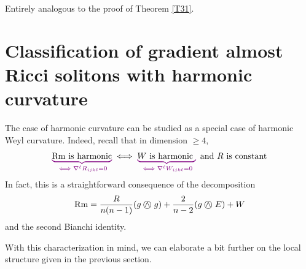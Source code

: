 \begin{demm}
	Entirely analogous to the proof of Theorem \cref{T31}.
\end{demm}


\section{Classification of gradient almost Ricci solitons with harmonic curvature}
The case of harmonic curvature can be studied as a special case of harmonic Weyl curvature. Indeed, recall that in dimension $\geq 4$,
\[
\Munderbrace{\Rm \text{ is harmonic}}{\iff \nabla^{\ell} R_{ijk\ell} = 0} \iff \Munderbrace{W \text{ is harmonic }}{\iff \nabla^{\ell} W_{ijk \ell} = 0} \text{ and } R \text{ is constant} 
\]
In fact, this is a straightforward consequence of the decomposition
\[
\mathrm{Rm} = \frac{R}{n(n-1)} (g \mathbin{\bigcirc\mspace{-15mu}\wedge\mspace{4mu}} g) + \frac{2}{n-2} (g \mathbin{\bigcirc\mspace{-15mu}\wedge\mspace{4mu}} E) + W
\]
and the second Bianchi identity.  \par 
With this characterization in mind, we can elaborate a bit further on the local structure given in the previous section.



